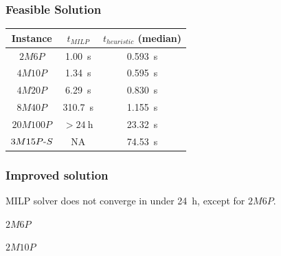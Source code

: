 \documentclass[english, frametitlelogo, mainlogoleft, handout]{beamer}
\begin{document}
\begin{frame}
    \frametitle{Feasible Solution}
    \centering
    \begin{tabular}{c c c}
        \toprule
        Instance           & $t_{MILP}$          & $t_{heuristic}$ (median) \\
        \midrule
        $2M6P$             & \SI{1.00}{\second}  & \SI{0.593}{\second} \\
        $4M10P$            & \SI{1.34}{\second}  & \SI{0.595}{\second} \\ 
        $4M20P$            & \SI{6.29}{\second}  & \SI{0.830}{\second} \\ 
        $8M40P$            & \SI{310.7}{\second} & \SI{1.155}{\second} \\
        $20M100P$          & $>\SI{24}{\hour}$   & \SI{23.32}{\second} \\
        \midrule
        $3M15P\text{-} S$ & NA                  & \SI{74.53}{\second} \\
        \bottomrule
    \end{tabular}
\end{frame}

\begin{frame}
    \frametitle{Improved solution}

    MILP solver does not converge in under \SI{24}{\hour}, except for $2M6P$.

    \vfill

    \begin{minipage}{0.48\linewidth}
        \centering
        $2M6P$
        \vspace{10pt}

        \resizebox{0.9\linewidth}{!}{}
    \end{minipage}
    \hfill
    \begin{minipage}{0.48\linewidth}
        \centering
        $2M10P$
        \vspace{10pt}

        \resizebox{0.9\linewidth}{!}{}
    \end{minipage}
\end{frame}
\end{document}

